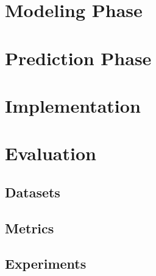 \section{Modeling Phase}


\section{Prediction Phase}


\section{Implementation}      


\section{Evaluation}   

\subsection{Datasets}

\subsection{Metrics}

\subsection{Experiments}


